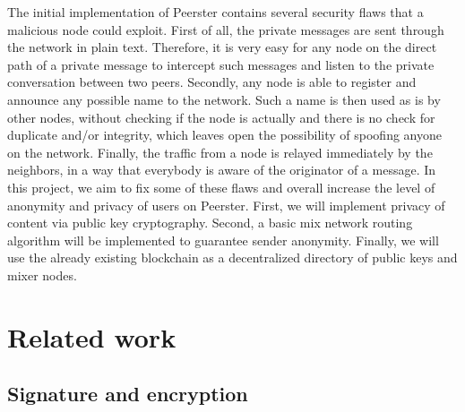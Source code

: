 \documentclass[11pt, a4paper]{article}
\begin{document}
    The initial implementation of Peerster contains several security flaws that a malicious node could exploit.
    First of all, the private messages are sent through the network in plain text.
    Therefore, it is very easy for any node on the direct path of a private message to intercept such messages and listen to the private conversation between two peers.
    Secondly, any node is able to register and announce any possible name to the network.
    Such a name is then used as is by other nodes, without checking if the node is actually and there is no check for duplicate and/or integrity,  which leaves open the possibility of spoofing anyone on the network.
    Finally, the traffic from a node is relayed immediately by the neighbors, in a way that everybody is aware of the originator of a message.
    In this project, we aim to fix some of these flaws and overall increase the level of anonymity and privacy of users on Peerster.
    First, we will implement privacy of content via public key cryptography.
    Second, a basic mix network routing algorithm will be implemented to guarantee sender anonymity.
    Finally, we will use the already existing blockchain as a decentralized directory of public keys and mixer nodes.




\section{Related work}

    \subsection{Signature and encryption}
\end{document}
